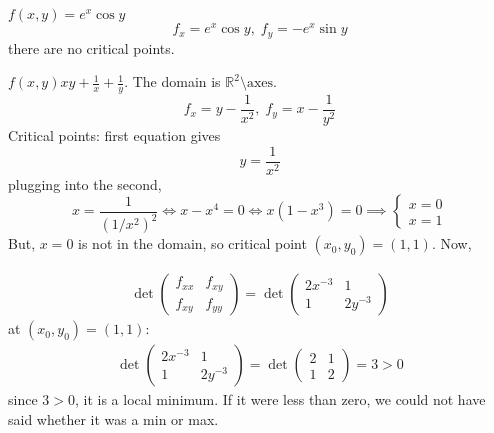 \documentclass[12pt]{book}
\theoremstyle{definition}
\theoremstyle{remark}
\begin{document}
  \begin{example}$f(x,y) = e^x \cos y$
    $$f_x = e^x \cos y, \; f_y = -e^x \sin y$$ 
    there are no critical points.
  \end{example}
  \begin{example}$f(x,y) xy + \frac{1}{x} + \frac{1}{y}$. The domain is $\mathbb{R}^2 \setminus \text{axes}$. 
    $$f_x = y - \frac{1}{x^2} , \; f_y = x - \frac{1}{y^2}  $$
    Critical points: first equation gives 
    $$y = \frac{1}{x^2}  $$
    plugging into the second, 
    $$x = \frac{1}{(1/x^2)^2} \iff x - x^4 = 0 \iff x(1- x^3) = 0 \implies \left\{ \begin{matrix}
      x = 0 \\ x = 1
    \end{matrix} \right. $$
    But, $x = 0$ is not in the domain, so critical point $(x_0, y_0) = (1,1)$. Now, 

    \begin{equation*}
      \begin{split}
      \det \begin{pmatrix}
        f_{xx} & f_{xy} \\ f_{xy} & f_{yy} 
      \end{pmatrix} = \det \begin{pmatrix}
        2x^{-3} & 1 \\ 1 & 2y^{-3}
      \end{pmatrix}
      \end{split}
    \end{equation*}
    at $(x_0, y_0) = (1,1):$
    \begin{equation*}
      \begin{split}
      \det \begin{pmatrix}
        2x^{-3} & 1 \\ 1 & 2y^{-3}
      \end{pmatrix} = \det \begin{pmatrix}
        2 & 1 \\ 1 & 2 
      \end{pmatrix} = 3 >0
      \end{split}
    \end{equation*}
    since $3>0$, it is a local minimum.  If it were less than zero, we could not have said whether it was a min or max. 

  \end{example}
\end{document}
